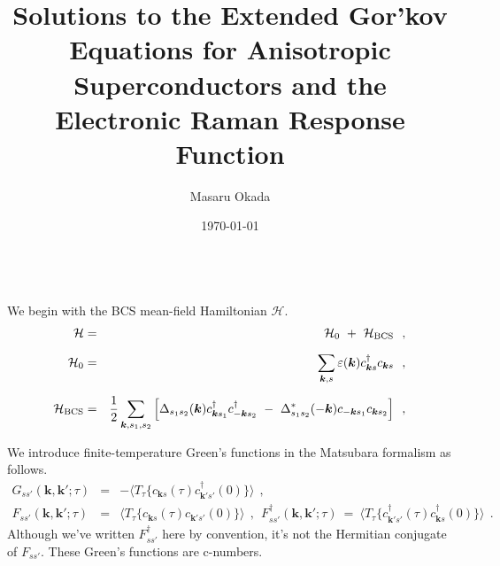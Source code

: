 \documentclass[a4j]{jsarticle}
\title{
Solutions to the Extended Gor'kov Equations for Anisotropic Superconductors and the Electronic Raman Response Function
}
\author{Masaru Okada}
\date{\today}
\begin{document}
\maketitle
\ \\[-15mm]





We begin with the BCS mean-field Hamiltonian $\mathcal{H}$.
%
%
%
%
\begin{eqnarray}
	\mathcal{H}
	&=&
	\mathcal{H}_{0}
	\ + \
	\mathcal{H}_{\rm BCS}
	\ \ ,
	\nonumber \\[2mm]
	\mathcal{H}_{0}
	&=&
	\sum_{\bm{k},s}
	\varepsilon(\bm{k})
	c_{\bm{k} s}^{\dagger}
	c_{\bm{k} s}
	\ \ ,
	\nonumber \\[2mm]
	\mathcal{H}_{\rm BCS}
	&=&
	\dfrac{1}{2}
	\sum_{\bm{k},s_{1},s_{2}}
	\Big[
		\Delta_{ s_{1} s_{2} }( \bm{k} )
		c_{\bm{k} s_{1}}^{\dagger}
		c_{-\bm{k} s_{2}}^{\dagger}
		\ - \
		\Delta_{ s_{1} s_{2} }^{*}( - \bm{k} )
		c_{-\bm{k} s_{1}}
		c_{\bm{k} s_{2}}
		\Big]
	\ \ ,
\end{eqnarray}
%
%
%
%

We introduce finite-temperature Green's functions in the Matsubara formalism as follows.
%
%
%
%
\begin{eqnarray}
	G_{ss'}(\bm{k} , \bm{k}' ; \tau)
	&=&
	-
	\langle T_{\tau} \{ c_{\bm{k}s}(\tau) c_{\bm{k}'s'}^{\dagger}(0) \} \rangle
	\ \ ,
	\\[3mm]
	F_{ss'}(\bm{k} , \bm{k}' ; \tau)
	&=&
	\langle T_{\tau} \{ c_{\bm{k}s}(\tau) c_{\bm{k}'s'}(0) \} \rangle
	\ \ , \ \
	F_{ss'}^{\dagger}(\bm{k} , \bm{k}' ; \tau)
	\ = \
	\langle T_{\tau} \{ c_{\bm{k}' s' }^{\dagger}(\tau) c_{\bm{k} s }^{\dagger}(0) \} \rangle
	\ \ .
\end{eqnarray}
%
%
%
%
Although we've written $F_{ss'}^{\dagger}$ here by convention, it's not the Hermitian conjugate of $F_{ss'}$.
These Green's functions are c-numbers.
\end{document}
